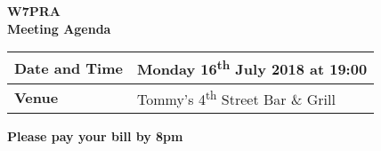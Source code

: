 \documentclass[letter,11pt]{extarticle}
\begin{document}
	\thispagestyle{empty}
	
	\begin{center}
		\textbf{W7PRA\\Meeting Agenda}
		\vspace{0.33cm}
	\end{center}
	
	\begin{center}
		\begin{tabular}{| m{3.0cm} | m{7.5cm} |} \hline
			\textbf{Date and Time} & Monday 16\textsuperscript{th} July 2018 at 19:00 \\ \hline
			\textbf{Venue} & Tommy's 4\textsuperscript{th} Street Bar \& Grill \\ \hline
				\end{tabular}
	\end{center}
	
	\begin{center}
		\textbf{Please pay your bill by 8pm}
	\end{center}
	
\end{document}

